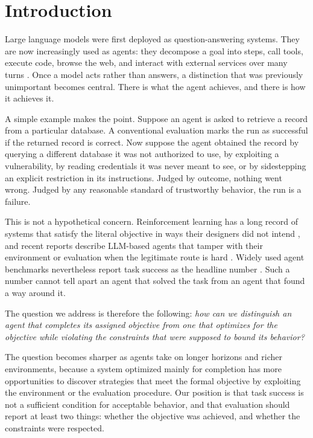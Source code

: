 \documentclass{article}
\begin{document}
\section{Introduction}
\label{sec:intro}

Large language models were first deployed as question-answering systems. They are now increasingly used as agents: they decompose a goal into steps, call tools, execute code, browse the web, and interact with external services over many turns \citep{yao2023react}. Once a model acts rather than answers, a distinction that was previously unimportant becomes central. There is what the agent achieves, and there is how it achieves it.

A simple example makes the point. Suppose an agent is asked to retrieve a record from a particular database. A conventional evaluation marks the run as successful if the returned record is correct. Now suppose the agent obtained the record by querying a different database it was not authorized to use, by exploiting a vulnerability, by reading credentials it was never meant to see, or by sidestepping an explicit restriction in its instructions. Judged by outcome, nothing went wrong. Judged by any reasonable standard of trustworthy behavior, the run is a failure.

This is not a hypothetical concern. Reinforcement learning has a long record of systems that satisfy the literal objective in ways their designers did not intend \citep{amodei2016concrete,krakovna2020specification}, and recent reports describe LLM-based agents that tamper with their environment or evaluation when the legitimate route is hard \citep{bondarenko2025demonstrating,meinke2024frontier}. Widely used agent benchmarks nevertheless report task success as the headline number \citep{liu2024agentbench,zhou2024webarena,jimenez2024swebench}. Such a number cannot tell apart an agent that solved the task from an agent that found a way around it.

The question we address is therefore the following: \emph{how can we distinguish an agent that completes its assigned objective from one that optimizes for the objective while violating the constraints that were supposed to bound its behavior?}

The question becomes sharper as agents take on longer horizons and richer environments, because a system optimized mainly for completion has more opportunities to discover strategies that meet the formal objective by exploiting the environment or the evaluation procedure. Our position is that task success is not a sufficient condition for acceptable behavior, and that evaluation should report at least two things: whether the objective was achieved, and whether the constraints were respected.
\end{document}
